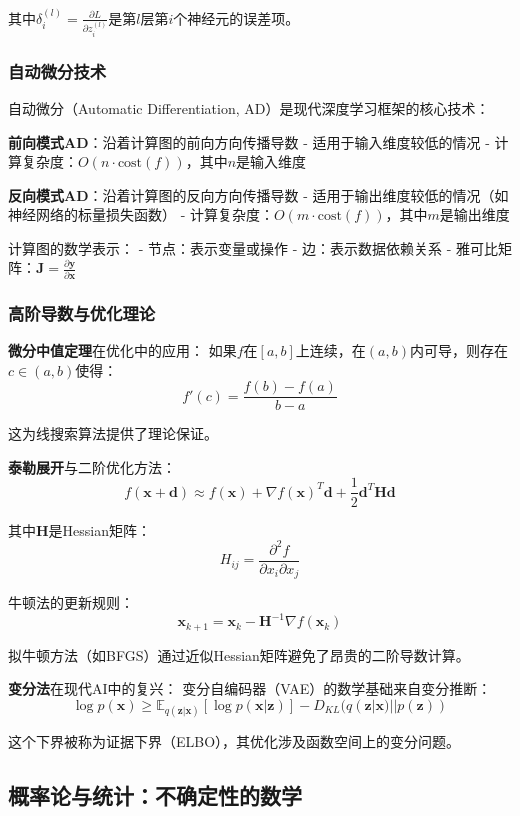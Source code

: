 其中$\delta_i^{(l)} = \frac{\partial L}{\partial z_i^{(l)}}$是第$l$层第$i$个神经元的误差项。

\subsubsection{自动微分技术}

自动微分（Automatic Differentiation, AD）是现代深度学习框架的核心技术：

\textbf{前向模式AD}：沿着计算图的前向方向传播导数
- 适用于输入维度较低的情况
- 计算复杂度：$O(n \cdot \text{cost}(f))$，其中$n$是输入维度

\textbf{反向模式AD}：沿着计算图的反向方向传播导数
- 适用于输出维度较低的情况（如神经网络的标量损失函数）
- 计算复杂度：$O(m \cdot \text{cost}(f))$，其中$m$是输出维度

计算图的数学表示：
- 节点：表示变量或操作
- 边：表示数据依赖关系
- 雅可比矩阵：$\mathbf{J} = \frac{\partial \mathbf{y}}{\partial \mathbf{x}}$

\subsubsection{高阶导数与优化理论}

\textbf{微分中值定理}在优化中的应用：
如果$f$在$[a,b]$上连续，在$(a,b)$内可导，则存在$c \in (a,b)$使得：
$$f'(c) = \frac{f(b) - f(a)}{b - a}$$

这为线搜索算法提供了理论保证。

\textbf{泰勒展开}与二阶优化方法：
$$f(\mathbf{x} + \mathbf{d}) \approx f(\mathbf{x}) + \nabla f(\mathbf{x})^T \mathbf{d} + \frac{1}{2}\mathbf{d}^T \mathbf{H} \mathbf{d}$$

其中$\mathbf{H}$是Hessian矩阵：
$$H_{ij} = \frac{\partial^2 f}{\partial x_i \partial x_j}$$

牛顿法的更新规则：
$$\mathbf{x}_{k+1} = \mathbf{x}_k - \mathbf{H}^{-1} \nabla f(\mathbf{x}_k)$$

拟牛顿方法（如BFGS）通过近似Hessian矩阵避免了昂贵的二阶导数计算。

\textbf{变分法}在现代AI中的复兴：
变分自编码器（VAE）的数学基础来自变分推断：
$$\log p(\mathbf{x}) \geq \mathbb{E}_{q(\mathbf{z}|\mathbf{x})}[\log p(\mathbf{x}|\mathbf{z})] - D_{KL}(q(\mathbf{z}|\mathbf{x})||p(\mathbf{z}))$$

这个下界被称为证据下界（ELBO），其优化涉及函数空间上的变分问题。

\subsection{概率论与统计：不确定性的数学}

